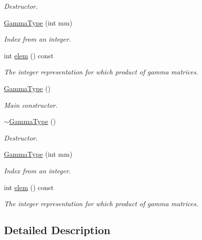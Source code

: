 \begin{DoxyCompactItemize}
\begin{DoxyCompactList}\small\item\em Destructor. \end{DoxyCompactList}\item 
\mbox{\hyperlink{classENSEM_1_1GammaType_ab93a83aeee6b442968d78f30cb6b4a65}{Gamma\+Type}} (int mm)
\begin{DoxyCompactList}\small\item\em Index from an integer. \end{DoxyCompactList}\item 
int \mbox{\hyperlink{classENSEM_1_1GammaType_a2813c3878cd269c7a37c588875682705}{elem}} () const
\begin{DoxyCompactList}\small\item\em The integer representation for which product of gamma matrices. \end{DoxyCompactList}\item 
\mbox{\hyperlink{classENSEM_1_1GammaType_a40badc5d1ed98704d66277e171adb121}{Gamma\+Type}} ()
\begin{DoxyCompactList}\small\item\em Main constructor. \end{DoxyCompactList}\item 
\mbox{\hyperlink{classENSEM_1_1GammaType_a2cc80e9a9f044b1b9b344f3419718a5e}{$\sim$\+Gamma\+Type}} ()
\begin{DoxyCompactList}\small\item\em Destructor. \end{DoxyCompactList}\item 
\mbox{\hyperlink{classENSEM_1_1GammaType_ab93a83aeee6b442968d78f30cb6b4a65}{Gamma\+Type}} (int mm)
\begin{DoxyCompactList}\small\item\em Index from an integer. \end{DoxyCompactList}\item 
int \mbox{\hyperlink{classENSEM_1_1GammaType_a2813c3878cd269c7a37c588875682705}{elem}} () const
\begin{DoxyCompactList}\small\item\em The integer representation for which product of gamma matrices. \end{DoxyCompactList}\end{DoxyCompactItemize}


\subsection{Detailed Description}
